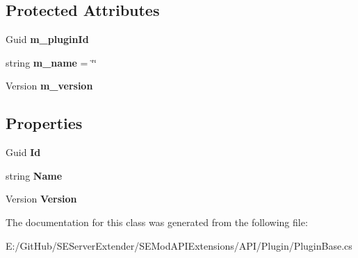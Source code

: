 \subsection*{Protected Attributes}
\begin{DoxyCompactItemize}
\item 
\hypertarget{class_s_e_mod_a_p_i_extensions_1_1_a_p_i_1_1_plugin_1_1_plugin_base_afd2c859a8d641a5bddd08c4a12599c4b}{}Guid {\bfseries m\+\_\+plugin\+Id}\label{class_s_e_mod_a_p_i_extensions_1_1_a_p_i_1_1_plugin_1_1_plugin_base_afd2c859a8d641a5bddd08c4a12599c4b}

\item 
\hypertarget{class_s_e_mod_a_p_i_extensions_1_1_a_p_i_1_1_plugin_1_1_plugin_base_a32751278d9c761b57c05628fa574c7a0}{}string {\bfseries m\+\_\+name} = \char`\"{}\char`\"{}\label{class_s_e_mod_a_p_i_extensions_1_1_a_p_i_1_1_plugin_1_1_plugin_base_a32751278d9c761b57c05628fa574c7a0}

\item 
\hypertarget{class_s_e_mod_a_p_i_extensions_1_1_a_p_i_1_1_plugin_1_1_plugin_base_ad91c7924b2029c34935d20198f576f5c}{}Version {\bfseries m\+\_\+version}\label{class_s_e_mod_a_p_i_extensions_1_1_a_p_i_1_1_plugin_1_1_plugin_base_ad91c7924b2029c34935d20198f576f5c}

\end{DoxyCompactItemize}
\subsection*{Properties}
\begin{DoxyCompactItemize}
\item 
\hypertarget{class_s_e_mod_a_p_i_extensions_1_1_a_p_i_1_1_plugin_1_1_plugin_base_abe601fc6cecfc77161010bc2aaa9dd4e}{}Guid {\bfseries Id}\label{class_s_e_mod_a_p_i_extensions_1_1_a_p_i_1_1_plugin_1_1_plugin_base_abe601fc6cecfc77161010bc2aaa9dd4e}

\item 
\hypertarget{class_s_e_mod_a_p_i_extensions_1_1_a_p_i_1_1_plugin_1_1_plugin_base_a40bef7b479d187395793f0c07e4a255c}{}string {\bfseries Name}\label{class_s_e_mod_a_p_i_extensions_1_1_a_p_i_1_1_plugin_1_1_plugin_base_a40bef7b479d187395793f0c07e4a255c}

\item 
\hypertarget{class_s_e_mod_a_p_i_extensions_1_1_a_p_i_1_1_plugin_1_1_plugin_base_a0836e33123f84aa0bb535f83092f8369}{}Version {\bfseries Version}\label{class_s_e_mod_a_p_i_extensions_1_1_a_p_i_1_1_plugin_1_1_plugin_base_a0836e33123f84aa0bb535f83092f8369}

\end{DoxyCompactItemize}


The documentation for this class was generated from the following file\+:\begin{DoxyCompactItemize}
\item 
E\+:/\+Git\+Hub/\+S\+E\+Server\+Extender/\+S\+E\+Mod\+A\+P\+I\+Extensions/\+A\+P\+I/\+Plugin/Plugin\+Base.\+cs\end{DoxyCompactItemize}
